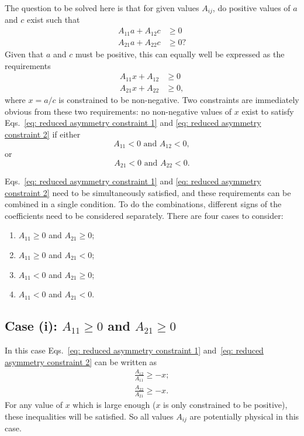 The question to be solved here is that for given values $A_{ij}$, do positive values of $a$ and $c$ exist such that
\begin{align}
    A_{11}a + A_{12}c &\geq 0\\
    A_{21}a + A_{22}c &\geq 0?
\end{align}
Given that $a$ and $c$ must be positive, this can equally well be expressed as the requirements
\begin{align}
    A_{11}x + A_{12} &\geq 0\label{eq: reduced asymmetry constraint 1}\\
    A_{21}x + A_{22} &\geq 0,\label{eq: reduced asymmetry constraint 2}
\end{align}
where $x = a/c$ is constrained to be non-negative. Two constraints are immediately obvious from these two requirements: no non-negative values of $x$ exist to satisfy Eqs.~\eqref{eq: reduced asymmetry constraint 1} and \eqref{eq: reduced asymmetry constraint 2} if either
\begin{equation}
    \label{eq: constraint 1}
    A_{11} < 0\text{ and }A_{12} < 0,
\end{equation}
    or
\begin{equation}
    \label{eq: constraint 2}
    A_{21} < 0\text{ and }A_{22} < 0.
\end{equation}
    
Eqs.~\eqref{eq: reduced asymmetry constraint 1} and \eqref{eq: reduced asymmetry constraint 2} need to be simultaneously satisfied, and these requirements can be combined in a single condition. To do the combinations, different signs of the coefficients need to be considered separately. There are four cases to consider:
\begin{enumerate}
    \item $A_{11} \geq 0$ and $A_{21} \geq 0$;
    \item $A_{11} \geq 0$ and $A_{21} < 0$;
    \item $A_{11} < 0$ and $A_{21} \geq 0$;
    \item $A_{11} < 0$ and $A_{21} < 0$.
\end{enumerate}

\subsection*{Case (i): $A_{11} \geq 0$ and $A_{21} \geq 0$}
In this case Eqs.~\eqref{eq: reduced asymmetry constraint 1} and~\eqref{eq: reduced asymmetry constraint 2} can be written as
\begin{align}
    \frac{A_{12}}{A_{11}} \geq -x; \label{eq: case 1-1}\\
    \frac{A_{22}}{A_{21}} \geq -x.\label{eq: case 1-2}
\end{align}
For any value of $x$ which is large enough ($x$ is only constrained to be positive), these inequalities will be satisfied. So all values $A_{ij}$ are potentially physical in this case.

